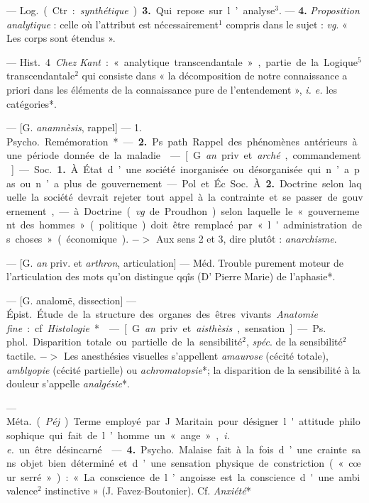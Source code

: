 \begin{itemize}[leftmargin=1cm, label=, itemsep=1pt]
{{{— \si{Log.} (Ctr. : {\it synthétique}). {\bf 3.} Qui
repose sur l’analyse$^3$. — {\bf 4.} {\it Proposition analytique} : celle où l’attribut
est nécessairement$^1$ compris dans le
sujet : {\it vg}. « Les corps sont étendus ».

— \si{Hist.} 4 {\it Chez Kant} : « analytique transcendantale », partie de
la Logique$^5$ transcendantale$^2$ qui
consiste dans « la décomposition de
notre connaissance a priori dans les
éléments de la connaissance pure de
l’entendement », {\it i. e.} les catégories*.

 — [G. {\it anamnèsis}, rappel] —
1. \si{Psycho.} Remémoration*. — {\bf 2.} Ps.
path. Rappel des phénomènes antérieurs à une période donnée de la
maladie.

 — [G. {\it an} priv. et {\it arché}, commandement] — \si{Soc.} {\bf 1.} À État
d’une société inorganisée ou désorganisée qui n’a pas ou n’a plus de
gouvernement.

— Pol. et Éc. \si{Soc.} À {\bf 2.} Doctrine
selon laquelle la société devrait
rejeter tout appel à la contrainte et
se passer de gouvernement, — à.
Doctrine ({\it vg}. de Proudhon) selon
laquelle le « gouvernement des
hommes » (politique) doit être remplacé par « l'administration des
choses » (économique). $->$ Aux
sens 2 et 3, dire plutôt : {\it anarchisme}.

 — [G. {\it an} priv. et {\it arthron},
articulation] — Méd. Trouble purement moteur de l'articulation des
mots qu’on distingue qqîs (D' Pierre
Marie) de l’aphasie*.

 — [G. analomë, dissection]
— \si{Épist.} Étude de la structure des
organes des êtres vivants. {\it Anatomie
fine} : cf. {\it Histologie}*.

 — [G. {\it an} priv. et {\it aisthèsis},
sensation] — \si{Ps. phol.} Disparition
totale ou partielle de la sensibilité$^2$,
{\it spéc}. de la sensibilité$^2$ tactile. $->$
Les anesthésies visuelles s’appellent
{\it amaurose} (cécité totale), {\it amblyopie}
(cécité partielle) ou {\it achromatopsie}*;
la disparition de la sensibilité à la
douleur s’appelle {\it analgésie}*.

 — \si{Méta.} ({\it Péj}.) Terme
employé par J. Maritain pour désigner l'attitude philosophique qui
fait de l’homme un « ange », {\it i. e.} un
être désincarné.

 — {\bf 4.} \si{Psycho.} Malaise fait à
la fois d’une crainte sans objet bien
déterminé et d’une sensation physique de constriction (« cœur serré ») :
« La conscience de l’angoisse est la
conscience d'une ambivalence$^2$ instinctive » (J. Favez-Boutonier). Cf.
{\it Anxiété}*

}}}
\end{itemize}
